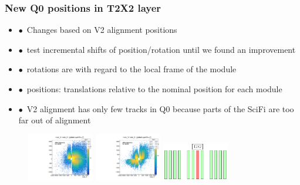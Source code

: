 \documentclass[aspectratio=1610, 12pt]{beamer}
\begin{document}
\begin{frame}\frametitle{New Q0 positions in T2X2 layer}
  \begin{itemize}
    \item $\bullet$\, Changes based on V2 alignment positions
    \item $\bullet$\, test incremental shifts of position/rotation until we found an improvement
    \item $\bullet$\, rotations are with regard to the local frame of the module
    \item $\bullet$\, positions: translations relative to the nominal position for each module
    \item $\bullet$\, V2 alignment has only few tracks in Q0 because parts of the SciFi are too far out of alignment
  \end{itemize}
  \begin{figure}
    \includegraphics[width=0.26\textwidth]{2023-feb-07/v2_layers/2D_nodeXY_v2_7.pdf}%
    \includegraphics[width=0.26\textwidth]{2023-mar-9-DPG/extendedVars/2D_nodeXY_quartermean_7.pdf}%
    \includegraphics[width=0.26\textwidth]{logos/bad_layer.png}%
  \end{figure}
\end{frame}
\end{document}
